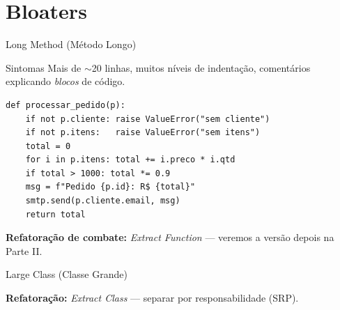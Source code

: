 \documentclass[aspectratio=169]{beamer}
\begin{document}
\section{Bloaters}

\begin{frame}[fragile]{Long Method (Método Longo)}
  \begin{alertblock}{Sintomas}
    Mais de $\sim$20 linhas, muitos níveis de indentação,
    comentários explicando \emph{blocos} de código.
  \end{alertblock}
\begin{lstlisting}
def processar_pedido(p):
    if not p.cliente: raise ValueError("sem cliente")
    if not p.itens:   raise ValueError("sem itens")
    total = 0
    for i in p.itens: total += i.preco * i.qtd
    if total > 1000: total *= 0.9
    msg = f"Pedido {p.id}: R$ {total}"
    smtp.send(p.cliente.email, msg)
    return total
\end{lstlisting}
  \footnotesize\textbf{Refatoração de combate:} \emph{Extract Function} --- veremos a versão depois na Parte II.
\end{frame}

\begin{frame}{Large Class (Classe Grande)}
  \begin{center}
  \end{center}
  \footnotesize\textbf{Refatoração:} \emph{Extract Class} --- separar por responsabilidade (SRP).
\end{frame}
\end{document}
